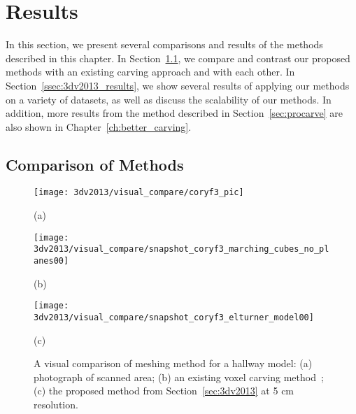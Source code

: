 \documentclass[12pt,onecolumn,oneside]{book}
\begin{document}
\section{Results}
\label{sec:carving_results}

In this section, we present several comparisons and results of the methods described in this chapter.  In Section~\ref{ssec:compare_3dv2013_procarve}, we compare and contrast our proposed methods with an existing carving approach and with each other.  In Section~\ref{ssec:3dv2013_results}, we show several results of applying our methods on a variety of datasets, as well as discuss the scalability of our methods.  In addition, more results from the method described in Section~\ref{sec:procarve} are also shown in Chapter~\ref{ch:better_carving}.

\subsection{Comparison of Methods}
\label{ssec:compare_3dv2013_procarve}

\begin{figure}
	
	\centering
	\begin{minipage}[b]{0.27\linewidth}
	\centerline{\texttt{[image: 3dv2013/visual\_compare/coryf3\_pic]}}
	\centerline{(a)}\medskip
	\end{minipage}
	\hfill
	\begin{minipage}[b]{0.35\linewidth}
	\centerline{\texttt{[image: 3dv2013/visual\_compare/snapshot\_coryf3\_marching\_cubes\_no\_planes00]}}
	\centerline{(b)}\medskip
	\end{minipage}
	\hfill
	\begin{minipage}[b]{0.35\linewidth}
	\centerline{\texttt{[image: 3dv2013/visual\_compare/snapshot\_coryf3\_elturner\_model00]}}
	\centerline{(c)}\medskip
	\end{minipage}

	\caption[Comparison between voxel carving methods.]{A visual comparison of meshing method for a hallway model:  (a) photograph of scanned area; (b) an existing voxel carving method~\cite{Carving}; (c) the proposed method from Section~\ref{sec:3dv2013} at 5 cm resolution.}
	\label{fig:mc_compare}

\end{figure}
\end{document}
